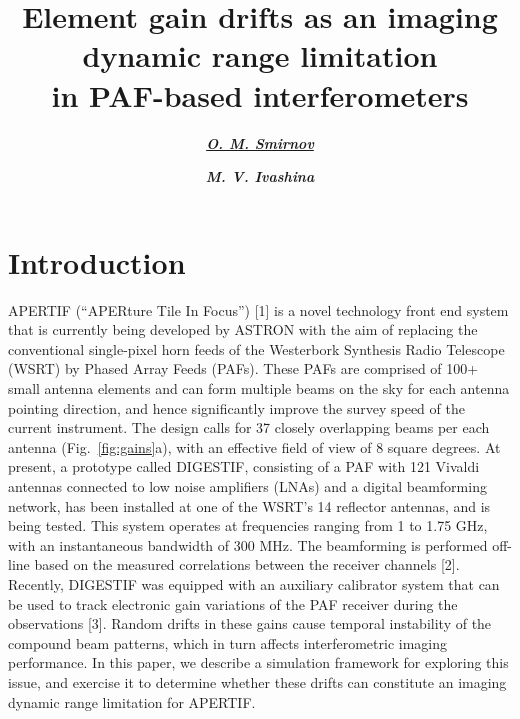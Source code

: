 \documentclass{aps2010} \special{papersize=8.5in,11in}
\title{Element gain drifts as an imaging dynamic range limitation\\in PAF-based
interferometers}
\author[org1]{\textbf{\underline{\emph{O. M. Smirnov}}}}
\author[org2]{\textbf{\emph{M. V. Ivashina}}}
\begin{document}
\maketitleblock


\section{Introduction}

\noindent APERTIF (“APERture Tile In Focus”) [1] is a novel technology front end system that is currently being developed by ASTRON with the aim of replacing the conventional single-pixel horn feeds of the Westerbork Synthesis Radio Telescope (WSRT) by Phased Array Feeds (PAFs). These PAFs are comprised of 100+ small antenna elements and can form multiple beams on the sky for each antenna pointing direction, and hence significantly improve the survey speed of the current instrument. The design calls for 37 closely overlapping beams per each antenna (Fig.~\ref{fig:gains}a), with an effective field of view of 8 square degrees. At present, a prototype called DIGESTIF, consisting of a PAF with 121 Vivaldi antennas connected to low noise amplifiers (LNAs) and a digital beamforming network, has been installed at one of the WSRT's 14 reflector antennas, and is being tested. This system operates at frequencies ranging from 1 to 1.75 GHz, with an instantaneous bandwidth of 300 MHz. The beamforming is performed off-line based on the measured correlations between the receiver channels [2]. Recently, DIGESTIF was equipped with an auxiliary calibrator system that can be used to track electronic gain variations of the PAF receiver during the observations [3]. Random drifts in these gains cause temporal instability of the compound beam patterns, which in turn affects interferometric imaging performance. In this paper, we describe a simulation framework for exploring this issue, and exercise it to determine whether these drifts can constitute an imaging dynamic range limitation for APERTIF.
\end{document}
